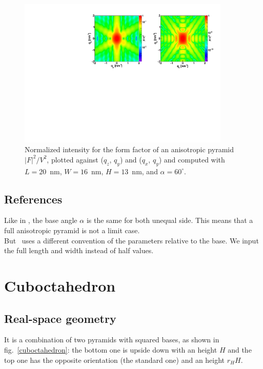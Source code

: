 \begin{figure}[h]
\begin{center}
\includegraphics[width=0.9\textwidth]{Figures/figffanisopyramid}
\end{center}
\caption{Normalized intensity for the form factor of an anisotropic
  pyramid $|F|^2/V^2$, plotted against ($q_z$, $q_y$) and  ($q_x$, $q_y$) and computed with $L=20$~nm, $W=16$~nm, $H=13$~nm,
  and $\alpha=60^{\circ}$.}
\label{figFFAnisoPyramidEx}
\end{figure}

\FloatBarrier

\subsection{References}
Like in , the base angle $\alpha$ is the same for both unequal
side. This means that a full anisotropic pyramid is not a limit case. \\
But \BornAgain\ uses a different convention of the parameters relative
to the base. We input the full length and width instead of half values.

\newpage{\cleardoublepage}
\section{Cuboctahedron}  

\subsection{Real-space geometry}
It is a combination of two pyramids with squared bases, as shown in fig.~\ref{cuboctahedron}: the bottom one
is upside down with an height $H$ and the top one has the opposite
orientation (the standard one) and an height $r_H H$.

